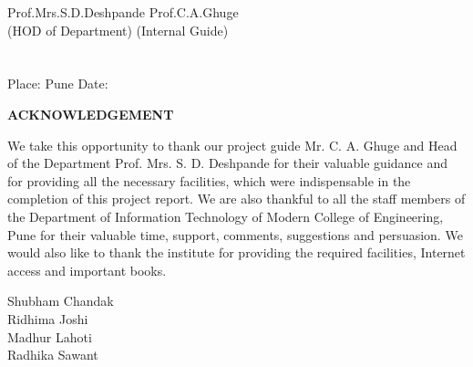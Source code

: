 \documentclass[12pt,a4paper]{article}
\begin{document}
Prof.Mrs.S.D.Deshpande\hspace{0.2 in}  \hspace{2.3 in} Prof.C.A.Ghuge\\
(HOD of Department)\hspace{0.8 in} \hspace{2.0 in}    (Internal Guide)\\\\\\
\singlespace
Place: Pune \hspace{3.5in}  Date:
\newpage
{}
\pagestyle{plain}           %
\begin{center}
\bf ACKNOWLEDGEMENT
\end{center}
\hspace{0.7cm}We take this opportunity to thank our project guide Mr. C. A. Ghuge and Head of the Department Prof. Mrs. S. D. Deshpande for their valuable guidance and for providing all the necessary facilities, which were indispensable in the completion of this project report. We are also thankful to all the staff members of the Department of Information Technology of Modern College of Engineering, Pune for their valuable time, support, comments, suggestions and persuasion. We would also like to thank the institute for providing the required facilities, Internet access and important books.  
\begin{flushright}
\hspace{3.5in} 
Shubham Chandak\\
Ridhima Joshi\\	
Madhur Lahoti\\
Radhika Sawant
\end{flushright}

\end{document}

